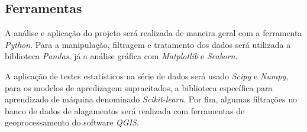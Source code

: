 \subsection{Ferramentas }
A análise e aplicação do projeto será realizada de maneira geral com a ferramenta \textit{Python}. Para a manipulação, filtragem e tratamento dos dados será utilizada a biblioteca \textit{Pandas}, já a análise gráfica com \textit{Matplotlib} e \textit{Seaborn}. 
\par A aplicação de testes estatísticos na série de dados será usado \textit{Scipy} e \textit{Numpy}, para os modelos de apredizagem supracitados, a biblioteca específica para aprendizado de máquina denominado \textit{Scikit-learn}. Por fim, algumas filtrações no banco de dados de alagamentos será realizada com ferramentas de geoprocessamento do software \textit{QGIS}. 



